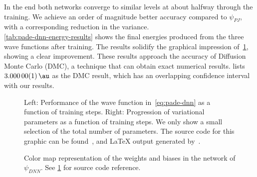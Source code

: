\documentclass[Thesis.tex]{subfiles}
\begin{document}
In the end both networks converge to similar levels at about halfway through the
training. We achieve an order of magnitude better accuracy compared to $\psi_{PJ}$, with a corresponding
reduction in the variance.\\

\cref{tab:pade-dnn-energy-results} shows the final energies produced from the
three wave functions after training. The results solidify the graphical impression
of~\cref{fig:QD-pade-dnn-training}, showing a clear improvement. These results
approach the accuracy of Diffusion Monte Carlo (DMC), a technique that can obtain
exact numerical results. \textcite{Pedersen-2011} lists $\SI{3.00000(1)}{\au}$
as the DMC result, which has an overlapping confidence interval with our results.

\begin{figure}[h]
   \centering
    \resizebox{\linewidth}{!}{%
        
    }
    \caption{\label{fig:QD-pade-dnn-training}Left: Performance of the wave
function in~\cref{eq:pade-dnn} as a function of training steps. Right:
Progression of variational parameters as a function of training steps. We only
show a small selection of the total number of parameters. The source code for this graphic
can be found~\cite[TODO: Add path]{MS-thesis-repository}, and \LaTeX{} output
generated by~\cite{nico_schlomer_2018_1173090}.}
\end{figure}

\begin{table}[h]
  \centering
  \label{tab:pade-dnn-energy-results}
  \caption{Energy using the neural network wave function in~\cref{eq:pade-dnn}, along with
the benchmark wave function after the same amount of optimization. Results obtained
from $2^{22}$ Monte Carlo samples and errors estimated by an automated blocking
algorithm by~\textcite{Jonsson-2018}. See
\cref{fig:QD-pade-dnn-training} for source code reference.}
  
\end{table}

%         

\begin{figure}[h]
   \centering
    \resizebox{\linewidth}{!}{%
        
    }
    \caption{\label{fig:QD-rbm-symmetry}Color map representation of the weights
      and biases in the network of $\psi_{DNN}$. See
\cref{fig:QD-pade-dnn-training} for source code reference.}
\end{figure}
\end{document}
